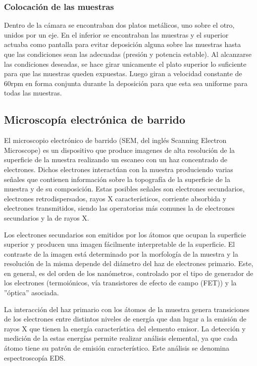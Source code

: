 \documentclass{article}
\theoremstyle{definition}
\theoremstyle{remark}
\begin{document}
\subsubsection{Colocación de las muestras}
Dentro de la cámara se encontraban dos platos metálicos, uno sobre el otro, unidos por un eje. En el inferior se encontraban las muestras y el superior actuaba como pantalla para evitar deposición alguna sobre las muestras hasta que las condiciones sean las adecuadas (presión y potencia estable). Al alcanzarse las condiciones deseadas, se hace girar unicamente el plato superior lo suficiente para que las muestras queden expuestas. Luego giran a velocidad constante de 60rpm en forma conjunta durante la deposición para que esta sea uniforme para todas las muestras.

\subsection{Microscopía electrónica de barrido}
El microscopio electrónico de barrido (SEM, del inglés Scanning Electron Microscope) es un dispositivo que produce imagenes de alta resolución de la superficie de la muestra realizando un escaneo con un haz concentrado de electrones. Dichos electrones interactúan con la muestra produciendo varias señales que contienen información sobre la topografía de la superficie de la muestra y de su composición. Estas posibles señales son electrones secundarios, electrones retrodispersados, rayos X característicos, corriente absorbida y electrones transmitidos, siendo las operatorias más comunes la de electrones secundarios y la de rayos X.

Los electrones secundarios son emitidos por los átomos que ocupan la superficie superior y producen una imagen fácilmente interpretable de la superficie. El contraste de la imagen está determinado por la morfología de la muestra y la resolución de la misma depende del diámetro del haz de electrones primario. Este, en general, es del orden de los nanómetros, controlado por el tipo de generador de los electrones (termoiónicos, vía transistores de efecto de campo (FET)) y la ''óptica” asociada.

La interacción del haz primario con los átomos de la muestra genera transiciones de los electrones entre distintos niveles de energía que dan lugar a la emisión de rayos X que tienen la energía característica del elemento emisor. La detección y medición de la estas energías permite realizar análisis elemental, ya que cada átomo tiene su patrón de emisión característico. Este análisis se denomina espectroscopía EDS.
\end{document}

